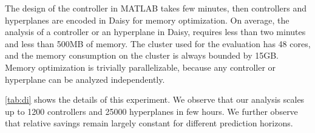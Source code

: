 The design of the controller in MATLAB takes few minutes, then controllers and
hyperplanes are encoded in Daisy for memory optimization. On average, the
analysis of a controller or an hyperplane in Daisy, requires less than two
minutes and less than 500MB of memory. The cluster used for the evaluation has
48 cores, and the memory consumption on the cluster is always bounded by
15GB. Memory optimization is trivially parallelizable, because any controller or
hyperplane can be analyzed independently.


\autoref{tab:di} shows the details of this experiment.
We observe that our analysis scales up to 1200 controllers and 25000 hyperplanes in few
hours. 
We further observe that relative savings remain largely constant for different 
prediction horizons.

